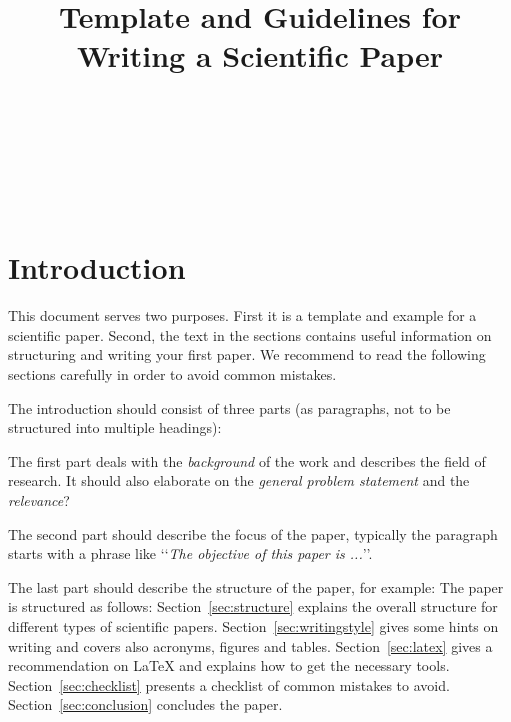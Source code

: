 \documentclass[10pt,a4paper,twoside,twocolumn]{article}
\def\lqq{\lq\lq}
\def\rqq{\rq\rq}
\def\zitat#1{\lqq \emph{#1}\rqq}
\begin{document}
\title{Template and Guidelines for Writing a Scientific Paper}

\author{
  \\
   \\
  \\
  \\
  \\
}

\maketitle


\section{Introduction}

This document serves two purposes. First it is a template and
example for a scientific paper. Second, the text in the sections
contains useful information on structuring and writing your first
paper. We recommend to read the following sections carefully in
order to avoid common mistakes.

The introduction should consist of three parts (as paragraphs, not
to be structured into multiple headings):

The first part deals with the \emph{background} of the work and
describes the field of research. It should also elaborate on the
\emph{general problem statement} and the \emph{relevance}?

The second part should describe the focus of the paper, typically
the paragraph starts with a phrase like \zitat{The objective of this
paper is ...}.

The last part should describe the structure of the paper, for
example: The paper is structured as follows:
Section~\ref{sec:structure} explains the overall structure for
different types of scientific papers. Section~\ref{sec:writingstyle}
gives some hints on writing and covers also acronyms, figures and
tables. Section~\ref{sec:latex} gives a recommendation on {\LaTeX}
and explains how to get the necessary tools.
Section~\ref{sec:checklist} presents a checklist of common mistakes
to avoid. Section~\ref{sec:conclusion} concludes the paper.
\end{document}
